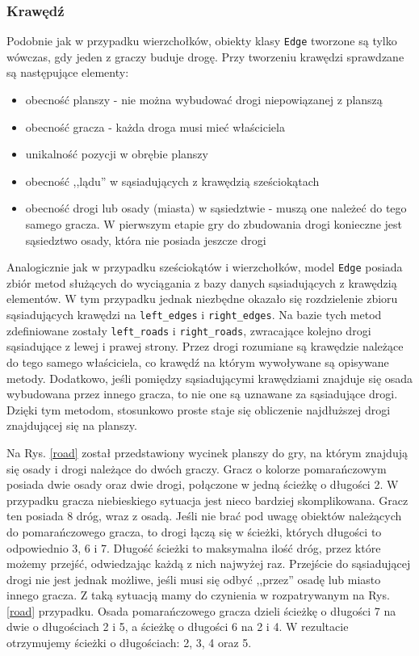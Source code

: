 \documentclass[a4paper,12pt]{article}
\providecommand{\imref}[1]{Rys. \ref{#1}} %
\begin{document}
\subsubsection{Krawędź}

Podobnie jak w przypadku wierzchołków, obiekty klasy \texttt{Edge}
tworzone są tylko wówczas, gdy jeden z graczy buduje drogę. Przy
tworzeniu krawędzi sprawdzane są następujące elementy:

\begin{itemize}
\item obecność planszy - nie można wybudować drogi niepowiązanej z
  planszą
\item obecność gracza - każda droga musi mieć właściciela
\item unikalność pozycji w obrębie planszy
\item obecność ,,lądu'' w sąsiadujących z krawędzią sześciokątach
\item obecność drogi lub osady (miasta) w sąsiedztwie - muszą one
  należeć do tego samego gracza. W pierwszym etapie gry do zbudowania
  drogi konieczne jest sąsiedztwo osady, która nie posiada jeszcze
  drogi
\end{itemize}

Analogicznie jak w przypadku sześciokątów i wierzchołków, model
\texttt{Edge} posiada zbiór metod służących do wyciągania z bazy
danych sąsiadujących z krawędzią elementów. W tym przypadku jednak
niezbędne okazało się rozdzielenie zbioru sąsiadujących krawędzi na
\texttt{left\_edges} i \texttt{right\_edges}. Na bazie tych metod
zdefiniowane zostały \texttt{left\_roads} i \texttt{right\_roads},
zwracające kolejno drogi sąsiadujące z lewej i prawej strony. Przez
drogi rozumiane są krawędzie należące do tego samego właściciela, co
krawędź na którym wywoływane są opisywane metody. Dodatkowo, jeśli
pomiędzy sąsiadującymi krawędziami znajduje się osada wybudowana przez
innego gracza, to nie one są uznawane za sąsiadujące drogi. Dzięki tym
metodom, stosunkowo proste staje się obliczenie najdłuższej drogi
znajdującej się na planszy.

Na \imref{road} został przedstawiony wycinek planszy do gry, na którym
znajdują się osady i drogi należące do dwóch graczy. Gracz o kolorze
pomarańczowym posiada dwie osady oraz dwie drogi, połączone w jedną
ścieżkę o długości 2. W przypadku gracza niebieskiego sytuacja jest
nieco bardziej skomplikowana. Gracz ten posiada 8 dróg, wraz z
osadą. Jeśli nie brać pod uwagę obiektów należących do pomarańczowego
gracza, to drogi łączą się w ścieżki, których długości to odpowiednio
3, 6 i 7. Długość ścieżki to maksymalna ilość dróg, przez które możemy
przejść, odwiedzając każdą z nich najwyżej raz. Przejście do
sąsiadującej drogi nie jest jednak możliwe, jeśli musi się odbyć
,,przez'' osadę lub miasto innego gracza. Z taką sytuacją mamy do
czynienia w rozpatrywanym na \imref{road} przypadku. Osada
pomarańczowego gracza dzieli ścieżkę o długości 7 na dwie o
długościach 2 i 5, a ścieżkę o długości 6 na 2 i 4. W rezultacie
otrzymujemy ścieżki o długościach: 2, 3, 4 oraz 5.
\end{document}
